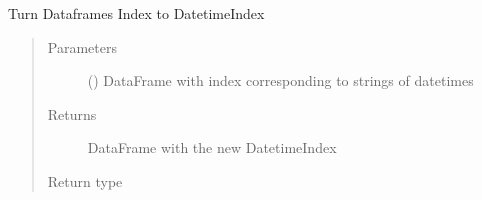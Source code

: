 \documentclass[letterpaper,10pt,english]{sphinxmanual}
\begin{document}
\begin{fulllineitems}
\label{\detokenize{epics_requests:epics_requests.correct_datetime}}
\sphinxAtStartPar
Turn Dataframes Index to DatetimeIndex
\begin{quote}\begin{description}
\item[{Parameters}] \leavevmode
\sphinxAtStartPar
{} () \textendash{} DataFrame with index corresponding to strings of datetimes

\item[{Returns}] \leavevmode
\sphinxAtStartPar
DataFrame with the new DatetimeIndex

\item[{Return type}] \leavevmode
\sphinxAtStartPar
{}

\end{description}\end{quote}

\end{fulllineitems}

\end{document}
